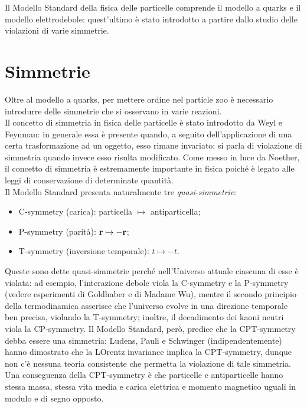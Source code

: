 
Il Modello Standard della fisica delle particelle comprende il modello a quarks e il modello elettrodebole: quest'ultimo è stato introdotto a partire dallo studio delle violazioni di varie simmetrie.

\section{Simmetrie}

Oltre al modello a quarks, per mettere ordine nel particle zoo è necessario introdurre delle simmetrie che si osservano in varie reazioni.\\
Il concetto di simmetria in fisica delle particelle è stato introdotto da Weyl e Feynman: in generale essa è presente quando, a seguito dell'applicazione di una certa trasformazione ad un oggetto, esso rimane invariato; si parla di violazione di simmetria quando invece esso risulta modificato. Come messo in luce da Noether, il concetto di simmetria è estremamente importante in fisica poiché è legato alle leggi di conservazione di determinate quantità.\\
Il Modello Standard presenta naturalmente tre \textit{quasi-simmetrie}:
\begin{itemize}
	\item C-symmetry (carica): particella $ \mapsto $ antiparticella;
	\item P-symmetry (parità): $ \mathbf{r} \mapsto -\mathbf{r} $;
	\item T-symmetry (inversione temporale): $ t \mapsto -t $.
\end{itemize}
Queste sono dette quasi-simmetrie perché nell'Universo attuale ciascuna di esse è violata: ad esempio, l'interazione debole viola la C-symmetry e la P-symmetry (vedere esperimenti di Goldhaber e di Madame Wu), mentre il secondo principio della termodinamica asserisce che l'universo evolve in una direzione temporale ben precisa, violando la T-symmetry; inoltre, il decadimento dei kaoni neutri viola la CP-symmetry. Il Modello Standard, però, predice che la CPT-symmetry debba essere una simmetria: Ludens, Pauli e Schwinger (indipendentemente) hanno dimostrato che la LOrentz invariance implica la CPT-symmetry, dunque non c'è nessuna teoria consistente che permetta la violazione di tale simmetria. Una conseguenza della CPT-symmetry è che particelle e antiparticelle hanno stessa massa, stessa vita media e carica elettrica e momento magnetico uguali in modulo e di segno opposto.


